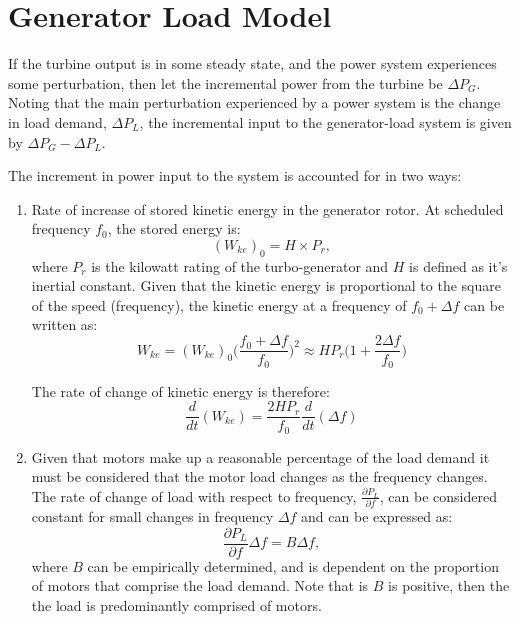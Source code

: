 \section{Generator Load Model}\label{app:gen_load_model}
If the turbine output is in some steady state, and the power system experiences some perturbation, then let the incremental power from the turbine be $\Delta P_G$. Noting that the main perturbation experienced by a power system is the change in load demand, $\Delta P_L$, the incremental input to the generator-load system is given by $\Delta P_G - \Delta P_L$.

The increment in power input to the system is accounted for in two ways:
\begin{enumerate}
	
	\item Rate of increase of stored kinetic energy in the generator rotor. At scheduled frequency $f_0$, the stored energy is:
	\begin{equation}
		(W_{ke})_0 = H \times P_r,
	\end{equation}
	where $P_r$ is the kilowatt rating of the turbo-generator and $H$ is defined as it's inertial constant. Given that the kinetic energy is proportional to the square of the speed (frequency), the kinetic energy at a frequency of $f_0 + \Delta f$ can be written as:
	\begin{equation}
		W_{ke} = (W_{ke})_0 \bigg( \frac{f_0 + \Delta f}{f_0} \bigg)^2 \approx H P_r \bigg( 1 + \frac{2\Delta f}{f_0} \bigg)
	\end{equation}
	
	The rate of change of kinetic energy is therefore:
	\begin{equation}
		\frac{d}{dt}(W_{ke}) = \frac{2 H P_r}{f_0} \frac{d}{dt} (\Delta f) \label{eq:A11}
	\end{equation}
	
	\item Given that motors make up a reasonable percentage of the load demand it must be considered that the motor load changes as the frequency changes. The rate of change of load with respect to frequency, $\frac{\partial P_L}{\partial f}$, can be considered constant for small changes in frequency $\Delta f$ and can be expressed as:
	\begin{equation}
		\frac{\partial P_L}{\partial f} \Delta f = B \Delta f \label{eq:A12},
	\end{equation}
	where $B$ can be empirically determined, and is dependent on the proportion of motors that comprise the load demand. Note that is $B$ is positive, then the the load is predominantly comprised of motors.
\end{enumerate}

